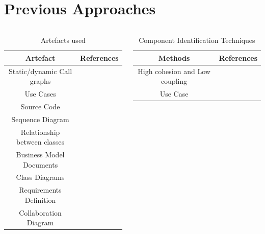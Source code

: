 \documentclass{beamer}
\begin{document}
\section{Previous Approaches}
\begin{frame}
	\begin{columns}
		\begin{column}{0.5\textwidth}
			\begin{table}
				\caption{Artefacts used }
				\begin{adjustbox}{width=\columnwidth,center}
					\begin{tabular}{|c c |} 
						\hline
						Artefact & References  \\ 
						\hline\hline
						Static/dynamic Call graphs & \cite{graphPartion}  \\ 
						\hline
						Use Cases & \cite{neural}\cite{genetic}\cite{CRUD} \\
						\hline
						Source Code  & \cite{graphPartion} \\
						\hline
						Sequence Diagram & \cite{CRUD}\cite{2}  \\
						\hline
						Relationship between classes & \cite{genetic}  \\ [1ex] 
						\hline
						Business Model Documents & \cite{graphPartion}\cite{FCA}  \\ [1ex]
						\hline
						Class Diagrams & \cite{genetic}\cite{CRUD}\cite{ClusteringClass}  \\ [1ex]
						\hline
						Requirements Definition & \cite{highCohesionLowCoupling}  \\ [1ex]
						\hline
						Collaboration Diagram & \cite{FCA}  \\ [1ex]
						\hline
					\end{tabular}
				\end{adjustbox}
			\end{table}
		\end{column}
	\begin{column}{0.5\textwidth}
		\begin{table}
			\caption{Component Identification Techniques}
				\begin{adjustbox}{width=\columnwidth,center}
				\begin{tabular}{|c c |} 
					\hline
					Methods & References  \\
					\hline\hline
					High cohesion and Low coupling & \cite{highCohesionLowCoupling}  \\ 
					\hline
					Use Case & \cite{useCase} \\

\end{tabular}
\end{adjustbox}
\end{table}
\end{column}
\end{columns}
\end{frame}
\end{document}
